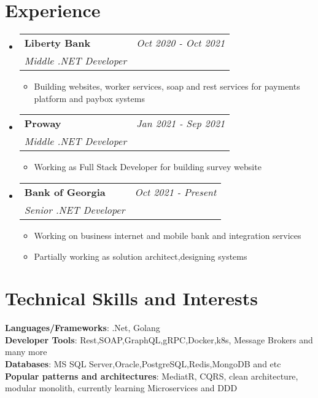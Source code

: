 \documentclass[a4paper,11pt]{article}
\makeatletter
\newcommand{\resumeSubheading}[4]{
\vspace{0.5mm}\item
    \begin{tabular*}{0.98\textwidth}[t]{l@{\extracolsep{\fill}}r}
        \textbf{#1} & \textit{\footnotesize{#4}} \\
        \textit{\footnotesize{#3}} &  \footnotesize{#2}\\
    \end{tabular*}
    \vspace{-2.4mm}
}
\newcommand{\resumeSubHeadingListStart}{\begin{itemize}[leftmargin=*,labelsep=0mm]}
\newcommand{\resumeItemListStart}{\begin{justify}\begin{itemize}[leftmargin=3ex, rightmargin=2ex, noitemsep,labelsep=1.2mm,itemsep=0mm]\small}
\newcommand{\resumeSubHeadingListEnd}{\end{itemize}\vspace{2mm}}
\newcommand{\resumeItemListEnd}{\end{itemize}\end{justify}\vspace{-2mm}}
\newcommand{\newpara}
    {
    \vskip 1cm
    }
\makeatother
\begin{document}
\newpara

\section{\textbf{Experience}}
  \resumeSubHeadingListStart
    \resumeSubheading
      { Liberty Bank} \
      {Middle .NET Developer}{Oct 2020 - Oct 2021}
      \vspace{-2.0mm}
      \resumeItemListStart
    \item {Building websites, worker services, soap and rest services for payments platform and paybox systems}
    \resumeItemListEnd
    
    \vspace{-3.0mm}
    
    \resumeSubheading
      { Proway} \
      {Middle .NET Developer}{Jan 2021 - Sep 2021}
      \vspace{-2.0mm}
      \resumeItemListStart
    \item {Working as Full Stack Developer for building survey website}
    \resumeItemListEnd

    \resumeSubheading
      { Bank of Georgia} \
      {Senior .NET Developer}{Oct 2021 - Present}
      \vspace{-2.0mm}
      \resumeItemListStart
    \item {Working on business internet and mobile bank and integration services}
    \item {Partially working as solution architect,designing systems}
    \resumeItemListEnd
      
  \resumeSubHeadingListEnd
\vspace{-8.5mm}

\newpara


\section{\textbf{Technical Skills and Interests}}
 \begin{itemize}[leftmargin=0.05in, label={}]
    \small{\item{
     \textbf{Languages/Frameworks}{: .Net, Golang} \\
     \textbf{Developer Tools}{: Rest,SOAP,GraphQL,gRPC,Docker,k8s, Message Brokers and many more} \\
     \textbf{Databases}{: MS SQL Server,Oracle,PostgreSQL,Redis,MongoDB and etc} \\
     \textbf{Popular patterns and architectures}{: MediatR, CQRS, clean architecture, modular monolith, currently learning Microservices and DDD } \\
    }}
 \end{itemize}
 \vspace{-16pt}


\end{document}
